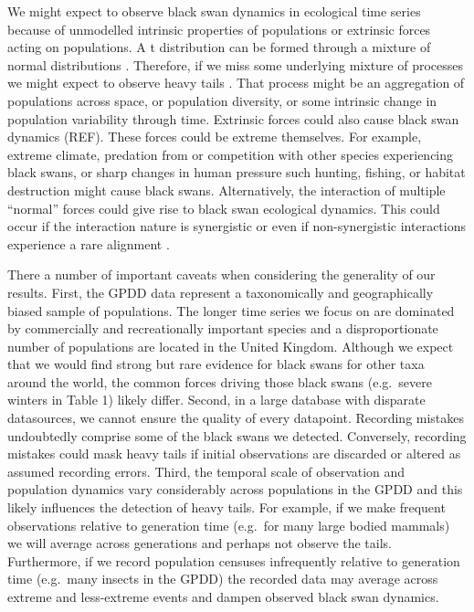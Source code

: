 We might expect to observe black swan dynamics in ecological time series because of unmodelled intrinsic properties of populations or extrinsic forces acting on populations. A t distribution can be formed through a mixture of normal distributions \citep[in which the variances are inverse-gamma distributed,][]{gelman2014}. Therefore, if we miss some underlying mixture of processes we might expect to observe heavy tails \citep{allen2001}. That process might be an aggregation of populations across space, or population diversity, or some intrinsic change in population variability through time. Extrinsic forces could also cause black swan dynamics (REF). These forces could be extreme themselves. For example, extreme climate, predation from or competition with other species experiencing black swans, or sharp changes in human pressure such hunting, fishing, or habitat destruction might cause black swans. Alternatively, the interaction of multiple ``normal'' forces could give rise to black swan ecological dynamics. This could occur if the interaction nature is synergistic \citep[e.g.][]{kirby2009} or even if non-synergistic interactions experience a rare alignment \citep{denny2009}.

There a number of important caveats when considering the generality of our results. First, the GPDD data represent a taxonomically and geographically biased sample of populations. The longer time series we focus on are dominated by commercially and recreationally important species and a disproportionate number of populations are located in the United Kingdom. Although we expect that we would find strong but rare evidence for black swans for other taxa around the world, the common forces driving those black swans (e.g.~severe winters in Table 1) likely differ. Second, in a large database with disparate datasources, we cannot ensure the quality of every datapoint. Recording mistakes undoubtedly comprise some of the black swans we detected. Conversely, recording mistakes could mask heavy tails if initial observations are discarded or altered as assumed recording errors. Third, the temporal scale of observation and population dynamics vary considerably across populations in the GPDD and this likely influences the detection of heavy tails. For example, if we make frequent observations relative to generation time (e.g.~for many large bodied mammals) we will average across generations and perhaps not observe the tails. Furthermore, if we record population censuses infrequently relative to generation time (e.g.~many insects in the GPDD) the recorded data may average across extreme and less-extreme events and dampen observed black swan dynamics.


